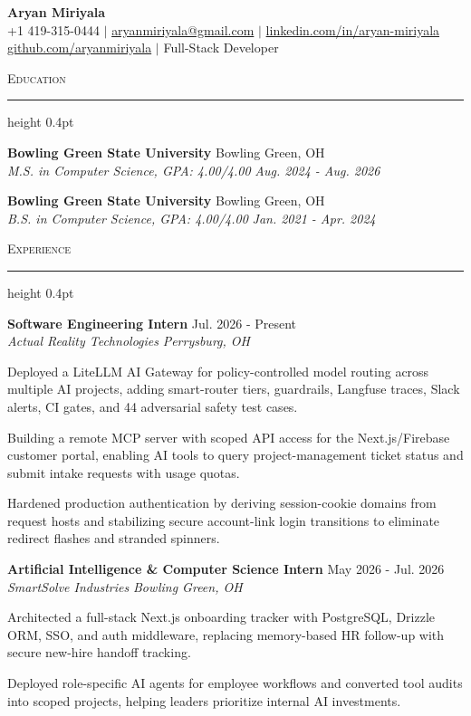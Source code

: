 \documentclass[letterpaper,11pt]{article}
\newcommand{\resumesection}[1]{%
  \par\vspace{2pt}%
  {\large\scshape #1}\par\vspace{2pt}%
  \hrule height 0.4pt\vspace{2pt}%
}
\newcommand{\resumeSubheading}[4]{
  \textbf{#1} \hfill #2\\
  \textit{#3} \hfill \textit{#4}
}
\begin{document}
\begin{center}
  {\LARGE \textbf{Aryan Miriyala}}\\[2pt]
  \small
  +1 419-315-0444 $|$ \href{mailto:aryanmiriyala@gmail.com}{aryanmiriyala@gmail.com} $|$ \href{https://www.linkedin.com/in/aryan-miriyala-7788a21b6/}{linkedin.com/in/aryan-miriyala}\\
  \href{https://github.com/aryanmiriyala}{github.com/aryanmiriyala} $|$ Full-Stack Developer
\end{center}\vspace{-6pt}

\resumesection{Education}
\resumeSubheading
{Bowling Green State University}{Bowling Green, OH}
{M.S. in Computer Science, GPA: 4.00/4.00}{Aug. 2024 - Aug. 2026}

\resumeSubheading
{Bowling Green State University}{Bowling Green, OH}
{B.S. in Computer Science, GPA: 4.00/4.00}{Jan. 2021 - Apr. 2024}

\resumesection{Experience}
\resumeSubheading
{Software Engineering Intern}{Jul. 2026 - Present}
{Actual Reality Technologies}{Perrysburg, OH}
\begin{tightitemize}
  \item Deployed a LiteLLM AI Gateway for policy-controlled model routing across multiple AI projects, adding smart-router tiers, guardrails, Langfuse traces, Slack alerts, CI gates, and 44 adversarial safety test cases.
  \item Building a remote MCP server with scoped API access for the Next.js/Firebase customer portal, enabling AI tools to query project-management ticket status and submit intake requests with usage quotas.
  \item Hardened production authentication by deriving session-cookie domains from request hosts and stabilizing secure account-link login transitions to eliminate redirect flashes and stranded spinners.
\end{tightitemize}

\resumeSubheading
{Artificial Intelligence \& Computer Science Intern}{May 2026 - Jul. 2026}
{SmartSolve Industries}{Bowling Green, OH}
\begin{tightitemize}
  \item Architected a full-stack Next.js onboarding tracker with PostgreSQL, Drizzle ORM, SSO, and auth middleware, replacing memory-based HR follow-up with secure new-hire handoff tracking.
  \item Deployed role-specific AI agents for employee workflows and converted tool audits into scoped projects, helping leaders prioritize internal AI investments.
\end{tightitemize}
\end{document}
